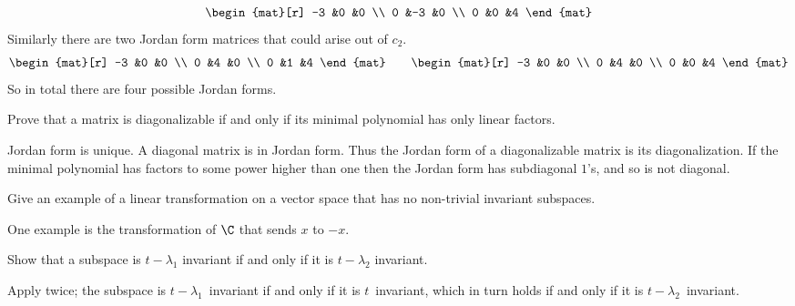 \begin{exercises}
\begin{answer}
\begin{equation*}
\begin{mat}[r]
          -3  &0  &0  \\
           0  &-3 &0  \\
           0  &0  &4
        \end{mat}
      \end{equation*}
      Similarly there are two Jordan form matrices that could arise
      out of $c_2$.
      \begin{equation*}
        \begin{mat}[r]
          -3  &0  &0  \\
           0  &4  &0  \\
           0  &1  &4
        \end{mat}
        \qquad
        \begin{mat}[r]
          -3  &0  &0  \\
           0  &4  &0  \\
           0  &0  &4
        \end{mat}
     \end{equation*}  
     So in total there are four possible Jordan forms.
    \end{answer}
  \recommended \item
    Prove that a matrix is diagonalizable if and only if its minimal
    polynomial has only linear factors.
    \begin{answer}
       Jordan form is unique.
       A diagonal matrix is in Jordan form.
       Thus the Jordan form of a diagonalizable matrix is its diagonalization.
       If the minimal polynomial has factors to some power higher than one
       then the Jordan form has subdiagonal \( 1 \)'s, and so is not
       diagonal.  
     \end{answer}
  \item 
    Give an example of a linear transformation on a vector
    space that has no non-trivial invariant subspaces.
    \begin{answer}
      One example is the transformation of \( \C \) that
       sends \( x \) to \( -x \).  
     \end{answer}
  \item 
    Show that a subspace is \( t-\lambda_1 \) invariant if and only if
    it is \( t-\lambda_2 \) invariant.
    \begin{answer}
      Apply  twice;
      the subspace is $t-\lambda_1$~invariant if and only if it is 
      $t$~invariant, which in turn holds if and only if it is 
      $t-\lambda_2$~invariant.  
    \end{answer}

\end{exercises}

